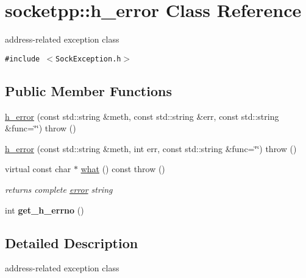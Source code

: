 \hypertarget{classsocketpp_1_1h__error}{
\section{socketpp::h\_\-error Class Reference}
\label{classsocketpp_1_1h__error}
}
address-related exception class  


{\tt \#include $<$SockException.h$>$}

\subsection*{Public Member Functions}
\begin{CompactItemize}
\item 
\hyperlink{classsocketpp_1_1h__error_c15a1c6216114250241349fdfcdeb98a}{h\_\-error} (const std::string \&meth, const std::string \&err, const std::string \&func=\char`\"{}\char`\"{})  throw ()
\item 
\hyperlink{classsocketpp_1_1h__error_67e7b6bcd23ebdd79a5fdcf1f01070fe}{h\_\-error} (const std::string \&meth, int err, const std::string \&func=\char`\"{}\char`\"{})  throw ()
\item 
\hypertarget{classsocketpp_1_1h__error_055c1a5b55b5d02fe81fd74cb8b900d2}{
virtual const char $\ast$ \hyperlink{classsocketpp_1_1h__error_055c1a5b55b5d02fe81fd74cb8b900d2}{what} () const   throw ()}
\label{classsocketpp_1_1h__error_055c1a5b55b5d02fe81fd74cb8b900d2}

\begin{CompactList}\small\item\em returns complete \hyperlink{classsocketpp_1_1error}{error} string \item\end{CompactList}\item 
\hypertarget{classsocketpp_1_1h__error_b2aabd50ea2f3189b09bc749a875e38f}{
int \textbf{get\_\-h\_\-errno} ()}
\label{classsocketpp_1_1h__error_b2aabd50ea2f3189b09bc749a875e38f}

\end{CompactItemize}


\subsection{Detailed Description}
address-related exception class 

